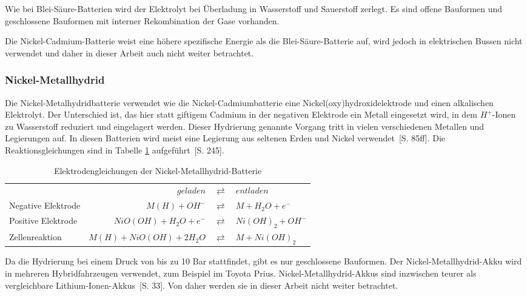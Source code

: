 Wie bei Blei-Säure-Batterien wird der Elektrolyt bei Überladung in Wasserstoff und Sauerstoff zerlegt. Es sind offene Bauformen und geschlossene Bauformen mit interner Rekombination der Gase vorhanden.

Die Nickel-Cadmium-Batterie weist eine höhere spezifische Energie als die Blei-Säure-Batterie auf, wird jedoch in elektrischen Bussen nicht verwendet und daher in dieser Arbeit auch nicht weiter betrachtet.

\subsubsection{Nickel-Metallhydrid}
Die Nickel-Metalhydridbatterie verwendet wie die Nickel-Cadmiumbatterie eine Nickel(oxy)hydroxidelektrode und einen alkalischen Elektrolyt. Der Unterschied ist, das hier statt giftigem Cadmium in der negativen Elektrode ein Metall eingesetzt wird, in dem $H^+$-Ionen zu Wasserstoff reduziert und eingelagert werden. Dieser Hydrierung genannte Vorgang tritt in vielen verschiedenen Metallen und Legierungen auf. In diesen Batterien wird meist eine Legierung aus seltenen Erden und Nickel verwendet~\cite{KiehneBattery}[S. 85ff]. Die Reaktionsgleichungen sind in Tabelle \ref{NiMH} aufgeführt~\cite{Sterner:2014}[S. 245].

\begin{table}\centering
	\begin{tabularx}{\linewidth}{XrcX}
		\toprule
		&              $geladen$ & $\rightleftarrows$ & $entladen$        \\
		Negative Elektrode &          $M(H) + OH^-$ & $\rightleftarrows$ & $M + H_2O + e^-$  \\
		Positive Elektrode &   $NiO(OH) + H_2O + e^-$ & $\rightleftarrows$ & $Ni(OH)_2 + OH^-$ \\ \midrule
		Zellenreaktion     & $M(H) + NiO(OH) + 2H_2O$ & $\rightleftarrows$ & $M + Ni(OH)_2$    \\ \bottomrule
	\end{tabularx}
	\caption{Elektrodengleichungen der Nickel-Metallhydrid-Batterie}
	\label{NiMH}
\end{table}

Da die Hydrierung bei einem Druck von bis zu 10 Bar stattfindet, gibt es nur geschlossene Bauformen. Der Nickel-Metallhydrid-Akku wird in mehreren Hybridfahrzeugen verwendet, zum Beispiel im Toyota Prius. Nickel-Metallhydrid-Akkus sind inzwischen teurer als vergleichbare Lithium-Ionen-Akkus~\cite{Schimke:2012}[S. 33]. Von daher werden sie in dieser Arbeit nicht weiter betrachtet.

